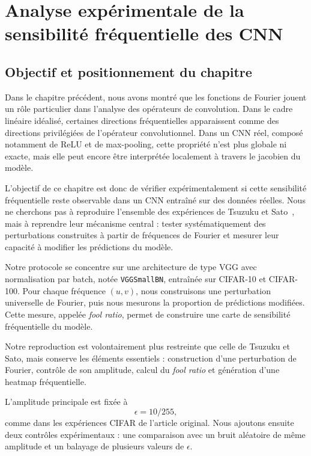 \chapter{Analyse expérimentale de la sensibilité fréquentielle des CNN}

\section{Objectif et positionnement du chapitre}
\label{sec:objectif_positionnement_chapitre4}

Dans le chapitre précédent, nous avons montré que les fonctions de Fourier jouent un rôle particulier
dans l'analyse des opérateurs de convolution. Dans le cadre linéaire idéalisé, certaines directions
fréquentielles apparaissent comme des directions privilégiées de l'opérateur convolutionnel. Dans un
CNN réel, composé notamment de ReLU et de max-pooling, cette propriété n'est plus globale ni exacte,
mais elle peut encore être interprétée localement à travers le jacobien du modèle.

L'objectif de ce chapitre est donc de vérifier expérimentalement si cette sensibilité fréquentielle reste
observable dans un CNN entraîné sur des données réelles. Nous ne cherchons pas à reproduire l'ensemble
des expériences de Tsuzuku et Sato~\cite{tsuzuku2019structural}, mais à reprendre leur mécanisme
central : tester systématiquement des perturbations construites à partir de fréquences de Fourier et
mesurer leur capacité à modifier les prédictions du modèle.

Notre protocole se concentre sur une architecture de type VGG avec normalisation par batch,
notée \texttt{VGGSmallBN}, entraînée sur CIFAR-10 et CIFAR-100. Pour chaque fréquence $(u,v)$,
nous construisons une perturbation universelle de Fourier, puis nous mesurons la proportion de
prédictions modifiées. Cette mesure, appelée \textit{fool ratio}, permet de construire une carte de
sensibilité fréquentielle du modèle.

Notre reproduction est volontairement plus restreinte que celle de Tsuzuku et Sato, mais conserve les éléments essentiels : construction d'une perturbation de Fourier,
contrôle de son amplitude, calcul du \textit{fool ratio} et génération d'une heatmap fréquentielle.

L'amplitude principale est fixée à
\[
    \epsilon = 10/255,
\]
comme dans les expériences CIFAR de l'article original. Nous ajoutons ensuite deux contrôles
expérimentaux : une comparaison avec un bruit aléatoire de même amplitude et un balayage de
plusieurs valeurs de $\epsilon$.

